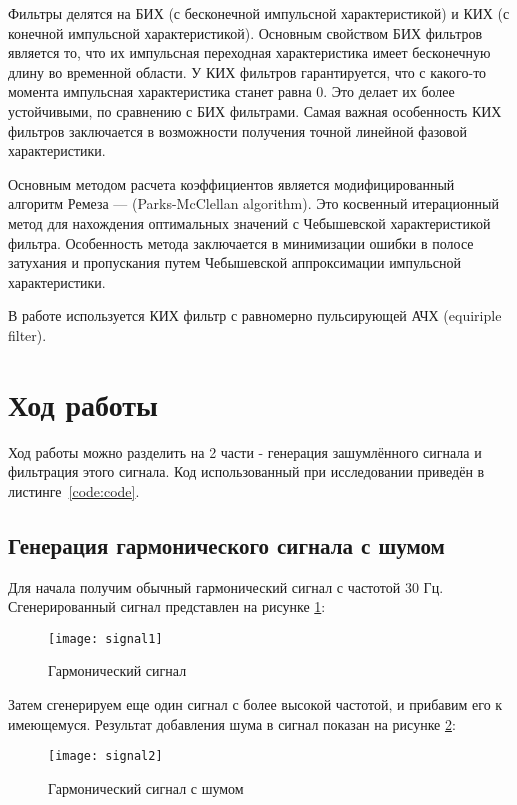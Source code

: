 Фильтры делятся на БИХ (с бесконечной импульсной характеристикой) и КИХ (с конечной импульсной характеристикой).
Основным свойством БИХ фильтров является то, что их импульсная переходная характеристика имеет бесконечную длину во временной области. У КИХ фильтров гарантируется, что с какого-то момента импульсная характеристика станет равна 0.
Это делает их более устойчивыми, по сравнению с БИХ фильтрами. Самая важная особенность КИХ фильтров заключается в возможности получения точной линейной фазовой характеристики. 

Основным методом расчета коэффициентов является модифицированный алгоритм Ремеза --- (Parks-McClellan algorithm). 
Это косвенный итерационный метод для нахождения оптимальных значений с Чебышевской характеристикой фильтра.
 Особенность метода заключается в минимизации ошибки в полосе затухания и пропускания путем Чебышевской аппроксимации импульсной характеристики.
 
В работе используется КИХ фильтр с равномерно пульсирующей АЧХ (equiriple filter). 

\section{Ход работы}

Ход работы можно разделить на 2 части - генерация зашумлённого сигнала и фильтрация этого сигнала.
Код использованный при исследовании приведён в листинге~\ref{code:code}.

\subsection{Генерация гармонического сигнала с шумом}
Для начала получим обычный гармонический сигнал с частотой 30 Гц. Сгенерированный сигнал представлен на рисунке \ref{pic:signal1}:
\begin{figure}[H]
	\begin{center}
		\texttt{[image: signal1]}
		\caption{Гармонический сигнал} 
		\label{pic:signal1} %
	\end{center}
\end{figure}

Затем сгенерируем еще один сигнал с более высокой частотой, и прибавим его к имеющемуся. Результат добавления шума в сигнал показан на рисунке \ref{pic:signal2}:
\begin{figure}[H]
	\begin{center}
		\texttt{[image: signal2]}
		\caption{Гармонический сигнал с шумом} 
		\label{pic:signal2} %
	\end{center}
\end{figure}

